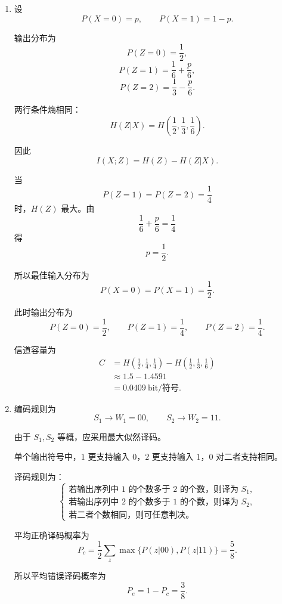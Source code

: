 \documentclass[UTF8,a4paper,12pt]{ctexart}
\begin{document}
\begin{enumerate}[label=\arabic*., leftmargin=2em]
\item 设
\[
P(X=0)=p,\qquad P(X=1)=1-p.
\]

输出分布为
\[
P(Z=0)=\frac12,
\]
\[
P(Z=1)=\frac16+\frac p6,
\]
\[
P(Z=2)=\frac13-\frac p6.
\]

两行条件熵相同：
\[
H(Z|X)=H\left(\frac12,\frac13,\frac16\right).
\]

因此
\[
I(X;Z)=H(Z)-H(Z|X).
\]

当
\[
P(Z=1)=P(Z=2)=\frac14
\]
时，$H(Z)$ 最大。由
\[
\frac16+\frac p6=\frac14
\]
得
\[
p=\frac12.
\]

所以最佳输入分布为
\[
P(X=0)=P(X=1)=\frac12.
\]

此时输出分布为
\[
P(Z=0)=\frac12,\qquad
P(Z=1)=\frac14,\qquad
P(Z=2)=\frac14.
\]

信道容量为
\[
\begin{aligned}
C
&=H\left(\frac12,\frac14,\frac14\right)
-H\left(\frac12,\frac13,\frac16\right)\\
&\approx 1.5-1.4591\\
&=0.0409\ \text{bit/符号}.
\end{aligned}
\]

\item 编码规则为
\[
S_1\to W_1=00,\qquad S_2\to W_2=11.
\]

由于 $S_1,S_2$ 等概，应采用最大似然译码。

单个输出符号中，$1$ 更支持输入 $0$，$2$ 更支持输入 $1$，$0$ 对二者支持相同。

译码规则为：
\[
\begin{cases}
\text{若输出序列中 }1\text{ 的个数多于 }2\text{ 的个数，则译为 }S_1,\\
\text{若输出序列中 }2\text{ 的个数多于 }1\text{ 的个数，则译为 }S_2,\\
\text{若二者个数相同，则可任意判决。}
\end{cases}
\]

平均正确译码概率为
\[
P_c=\frac12\sum_z\max\{P(z|00),P(z|11)\}
=\frac58.
\]

所以平均错误译码概率为
\[
P_e=1-P_c=\frac38.
\]
\end{enumerate}
\end{document}
